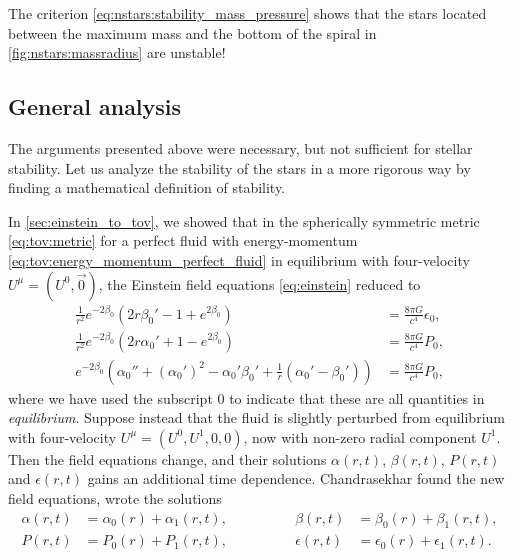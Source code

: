 The criterion \eqref{eq:nstars:stability_mass_pressure} shows that the stars located between the maximum mass and the bottom of the spiral in \cref{fig:nstars:massradius} are unstable!

\subsection{General analysis}

The arguments presented above were necessary, but not sufficient for stellar stability.
Let us analyze the stability of the stars in a more rigorous way by finding a mathematical definition of stability.

In \cref{sec:einstein_to_tov}, we showed that in the spherically symmetric metric \eqref{eq:tov:metric} for a perfect fluid with energy-momentum \eqref{eq:tov:energy_momentum_perfect_fluid} in equilibrium with four-velocity $U^\mu = (U^0, \vec{0})$, the Einstein field equations \eqref{eq:einstein} reduced to
\begin{subequations}
\begin{align}
	\frac{1}{r^2} e^{-2 \beta_0} \left( 2 r \beta_0' - 1 + e^{2 \beta_0} \right)                         &= \frac{8 \pi G}{c^4} \epsilon_0        , \\
	\frac{1}{r^2} e^{-2 \beta_0} \left( 2 r \alpha_0' + 1 - e^{2 \beta_0} \right)                              &= \frac{8 \pi G}{c^4} P_0         , \\
	e^{-2 \beta_0} \left( \alpha_0'' + (\alpha_0')^2 - \alpha_0' \beta_0' + \frac{1}{r} (\alpha_0' - \beta_0') \right) &= \frac{8 \pi G}{c^4} P_0,
\end{align}
\label{eq:nstars:field_equations_equilibrium}
\end{subequations}
where we have used the subscript $0$ to indicate that these are all quantities in \emph{equilibrium}.
Suppose instead that the fluid is slightly perturbed from equilibrium with four-velocity $U^\mu = (U^0, U^1, 0, 0)$, now with non-zero radial component $U^1$.
Then the field equations change, and their solutions $\alpha(r,t)$, $\beta(r,t)$, $P(r,t)$ and $\epsilon(r,t)$ gains an additional time dependence.
Chandrasekhar found the new field equations, wrote the solutions
\begin{equation}
\begin{aligned}
	\alpha   (r, t) &= \alpha_0  (r) + \alpha_1  (r, t), & \qquad \qquad
	\beta    (r, t) &= \beta_0   (r) + \beta_1   (r, t), \\
	P        (r, t) &= P_0       (r) + P_1       (r, t), & \qquad \qquad
	\epsilon (r, t) &= \epsilon_0(r) + \epsilon_1(r, t). \\
\end{aligned}
\end{equation}
